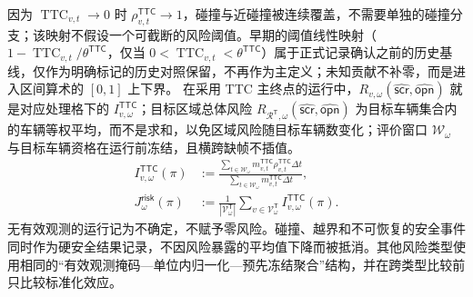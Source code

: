 \documentclass[10pt,a4paper,twocolumn]{article}
\begin{document}
因为 $\operatorname{TTC}_{v,t}\to 0$ 时 $\rho_{v,t}^{\mathsf{TTC}}\to 1$，碰撞与近碰撞被连续覆盖，不需要单独的碰撞分支；该映射不假设一个可截断的风险阈值。早期的阈值线性映射（$1-\operatorname{TTC}_{v,t}/\theta^{\mathsf{TTC}}$，仅当 $0<\operatorname{TTC}_{v,t}<\theta^{\mathsf{TTC}}$）属于正式记录确认之前的历史基线，仅作为明确标记的历史对照保留，不再作为主定义；未知贡献不补零，而是进入区间算术的 $[0,1]$ 上下界。
在采用 TTC 主终点的运行中，$R_{v,\omega}(\hat{\mathsf{scr}},\hat{\mathsf{opn}})$ 就是对应处理格下的 $I_{v,\omega}^{\mathsf{TTC}}$；目标区域总体风险 $R_{\mathcal R^{\mathsf T},\omega}(\hat{\mathsf{scr}},\hat{\mathsf{opn}})$ 为目标车辆集合内的车辆等权平均，而不是求和，以免区域风险随目标车辆数变化；评价窗口 $\mathcal W_\omega$ 与目标车辆资格在运行前冻结，且横跨缺帧不插值。
\begin{equation*}
\begin{aligned}
I_{v,\omega}^{\mathsf{TTC}}(\pi)
&:=\frac{\sum_{t\in\mathcal W_\omega}m_{v,t}^{\mathsf{TTC}}
\rho_{v,t}^{\mathsf{TTC}}\Delta t}
{\sum_{t\in\mathcal W_\omega}m_{v,t}^{\mathsf{TTC}}\Delta t},\\
J_{\omega}^{\mathsf{risk}}(\pi)
&:=\frac{1}{\left|\mathcal V^{\mathsf T}_{\omega}\right|}\sum_{v\in\mathcal V^{\mathsf T}_{\omega}}I_{v,\omega}^{\mathsf{TTC}}(\pi).
\end{aligned}
\end{equation*}
无有效观测的运行记为不确定，不赋予零风险。碰撞、越界和不可恢复的安全事件同时作为硬安全结果记录，不因风险暴露的平均值下降而被抵消。其他风险类型使用相同的“有效观测掩码—单位内归一化—预先冻结聚合”结构，并在跨类型比较前只比较标准化效应。
\end{document}
